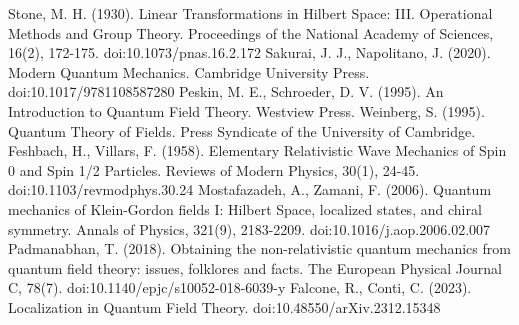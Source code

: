 \documentclass[11pt]{article}
\numberwithin{equation}{section}
\begin{document}
\begin{thebibliography}{9}
    Stone, M. H. (1930). Linear Transformations in Hilbert Space: III. Operational Methods and Group Theory. Proceedings of the National Academy of Sciences, 16(2), 172-175. doi:10.1073/pnas.16.2.172
    Sakurai, J. J., Napolitano, J. (2020). Modern Quantum Mechanics. Cambridge University Press. doi:10.1017/9781108587280
    Peskin, M. E., Schroeder, D. V. (1995). An Introduction to Quantum Field Theory. Westview Press.
    Weinberg, S. (1995). Quantum Theory of Fields. Press Syndicate of the University of Cambridge.
    Feshbach, H., Villars, F. (1958). Elementary Relativistic Wave Mechanics of Spin 0 and Spin 1/2 Particles. Reviews of Modern Physics, 30(1), 24-45. doi:10.1103/revmodphys.30.24
    Mostafazadeh, A., Zamani, F. (2006). Quantum mechanics of Klein-Gordon fields I: Hilbert Space, localized states, and chiral symmetry. Annals of Physics, 321(9), 2183-2209. doi:10.1016/j.aop.2006.02.007
    Padmanabhan, T. (2018). Obtaining the non-relativistic quantum mechanics from quantum field theory: issues, folklores and facts. The European Physical Journal C, 78(7). doi:10.1140/epjc/s10052-018-6039-y
    Falcone, R., Conti, C. (2023). Localization in Quantum Field Theory. doi:10.48550/arXiv.2312.15348
\end{thebibliography}
\end{document}
